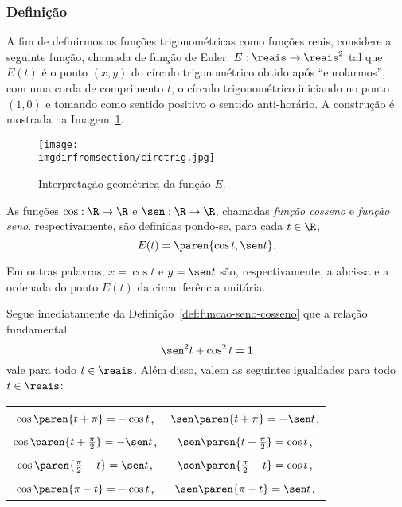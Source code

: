 \subsubsection{Definição}

A fim de definirmos as funções trigonométricas como funções
reais, considere a seguinte função, chamada de função de Euler: $E:
\reais \to \reais^2$ tal que $E(t)$ é o ponto $(x, y)$ do círculo
trigonométrico obtido após ``enrolarmos'', com uma corda de comprimento
$t$, o círculo trigonométrico iniciando no ponto $(1, 0)$ e tomando
como sentido positivo o sentido anti-horário. 
A construção é mostrada na Imagem~\ref{fig:ciclo-trigonometrico}.

\begin{figure}[H]
\centering
\texttt{[image: \\imgdirfromsection/circtrig.jpg]}
\caption{Interpretação geométrica da função $E$.}
\label{fig:ciclo-trigonometrico}
\end{figure}

\begin{definition}
\label{def:funcao-seno-cosseno}
	As funções $\cos : \R \to \R$ e $\sen : \R \to \R$, chamadas
\emph{função cosseno} e \emph{função seno}. respectivamente, são
definidas pondo-se, para cada $t \in \R$,
$$E(t) = \paren{\cos t , \sen t}.$$

Em outras palavras, $x= \cos t$ e $y = \sen t$ são, respectivamente,
a abcissa e a ordenada do ponto $E(t)$ da circunferência unitária.
\end{definition}

Segue imediatamente da Definição~\ref{def:funcao-seno-cosseno} que a
relação fundamental $$ \sen^2 t + \cos^2 t = 1$$ vale para todo $t
\in \reais$.
Além disso, valem as seguintes igualdades para todo $t \in \reais$:
\begin{center}
\begin{tabular}{ c c }
	$\cos \paren{t+ \pi} = -\cos t$, & $\sen \paren{t+ \pi} = -\sen t$, \\
	$\cos \paren{t+ \frac {\pi} 2} = -\sen t$, & $\sen \paren{t+ \frac {\pi} 2} = \cos t$, \\
	$\cos \paren{ \frac {\pi} 2 -t} = \sen t$, & $\sen \paren{ \frac {\pi} 2 -t} = \cos t$, \\
	$\cos \paren{ \pi -t} = -\cos t$, & $\sen \paren{ \pi -t} = \sen t$. \\
  \end{tabular}
\end{center}

